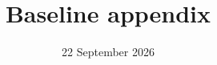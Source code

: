 \documentclass{article}
\title{Baseline appendix}
\author{}
\date{22 September 2026}
\begin{document}
\maketitle
\appendix

\begingroup
\small


\endgroup
\end{document}
